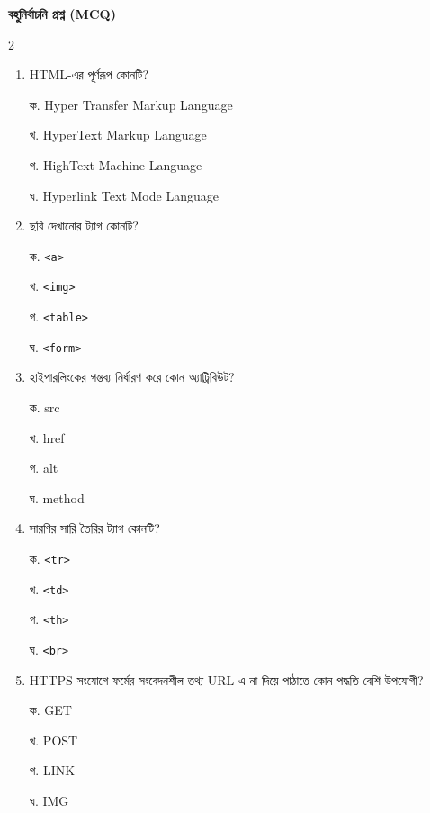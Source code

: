 \begin{practicebox}
\textbf{বহুনির্বাচনি প্রশ্ন (MCQ)}
\begin{multicols}{2}
\begin{enumerate}[leftmargin=*,itemsep=5pt]
\item \begin{minipage}[t]{\linewidth}\vspace{0pt}
HTML-এর পূর্ণরূপ কোনটি?
\par ক. Hyper Transfer Markup Language
\par খ. HyperText Markup Language
\par গ. HighText Machine Language
\par ঘ. Hyperlink Text Mode Language
\end{minipage}

\item \begin{minipage}[t]{\linewidth}\vspace{0pt}
ছবি দেখানোর ট্যাগ কোনটি?
\par ক. \texttt{<a>}
\par খ. \texttt{<img>}
\par গ. \texttt{<table>}
\par ঘ. \texttt{<form>}
\end{minipage}

\item \begin{minipage}[t]{\linewidth}\vspace{0pt}
হাইপারলিংকের গন্তব্য নির্ধারণ করে কোন অ্যাট্রিবিউট?
\par ক. src
\par খ. href
\par গ. alt
\par ঘ. method
\end{minipage}

\item \begin{minipage}[t]{\linewidth}\vspace{0pt}
সারণির সারি তৈরির ট্যাগ কোনটি?
\par ক. \texttt{<tr>}
\par খ. \texttt{<td>}
\par গ. \texttt{<th>}
\par ঘ. \texttt{<br>}
\end{minipage}

\item \begin{minipage}[t]{\linewidth}\vspace{0pt}
HTTPS সংযোগে ফর্মের সংবেদনশীল তথ্য URL-এ না দিয়ে পাঠাতে কোন পদ্ধতি বেশি উপযোগী?
\par ক. GET
\par খ. POST
\par গ. LINK
\par ঘ. IMG
\end{minipage}
\end{enumerate}
\end{multicols}
\end{practicebox}

